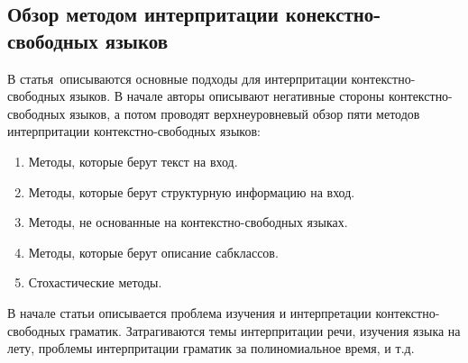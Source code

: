 \subsection{Обзор методом интерпритации конекстно-свободных языков} \label{subsection_Lee1996}
В статья\,\cite{Lee1996} описываются основные подходы для интерпритации контекстно-свободных языков. В начале авторы описывают негативные стороны контекстно-свободных языков, а потом проводят верхнеуровневый обзор пяти методов интерпритации контекстно-свободных языков: 
\begin{enumerate} 
	\item{Методы, которые берут текст на вход.}
	\item{Методы, которые берут структурную информацию на вход.}
	\item{Методы, не основанные на контекстно-свободных языках.}
	\item{Методы, которые берут описание сабклассов.}
	\item{Стохастические методы.}
\end{enumerate}

В начале статьи описывается проблема изучения и интерпретации контекстно-свободных граматик. Затрагиваются темы интерпритации речи, изучения языка на лету, проблемы интерпритации граматик за полиномиальное время, и т.д.

